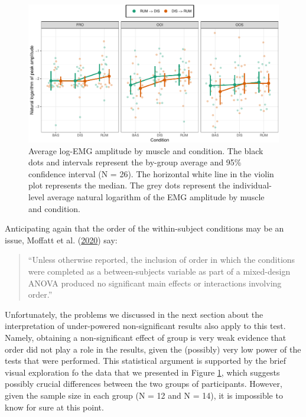 \documentclass[
  english,
  man, donotrepeattitle,floatsintext]{apa6}
\begin{document}
\begin{figure}[!htb]

{\centering \includegraphics[width=1\linewidth]{manuscript_files/figure-latex/order-1} 

}

\caption{Average log-EMG amplitude by muscle and condition. The black dots and intervals represent the by-group average and 95\% confidence interval (N = 26). The horizontal white line in the violin plot represents the median. The grey dots represent the individual-level average natural logarithm of the EMG amplitude by muscle and condition.}\label{fig:order}
\end{figure}

Anticipating again that the order of the within-subject conditions may be an issue, Moffatt et al. (\protect\hyperlink{ref-moffatt_inner_2020}{2020}) say:

\begin{quote}
``Unless otherwise reported, the inclusion of order in which the conditions were completed as a between-subjects variable as part of a mixed-design ANOVA produced no significant main effects or interactions involving order.''
\end{quote}

Unfortunately, the problems we discussed in the next section about the interpretation of under-powered non-significant results also apply to this test. Namely, obtaining a non-significant effect of group is very weak evidence that order did not play a role in the results, given the (possibly) very low power of the tests that were performed. This statistical argument is supported by the brief visual exploration fo the data that we presented in Figure \ref{fig:order}, which suggests possibly crucial differences between the two groups of participants. However, given the sample size in each group (N = 12 and N = 14), it is impossible to know for sure at this point.
\end{document}
